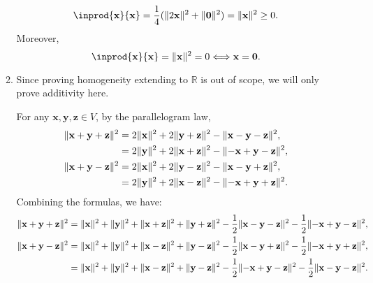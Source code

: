 \documentclass{huhtakm-template-book-v2}
\begin{document}
\begin{proofing}
\begin{itemize}
\begin{enumerate}
\begin{equation*}
                    \inprod{\mathbf{x}}{\mathbf{x}} = \frac{1}{4}(\norm{2\mathbf{x}}^{2} + \norm{\mathbf{0}}^{2}) = \norm{\mathbf{x}}^{2} \geq 0.
                \end{equation*}
                Moreover,
                \begin{equation*}
                    \inprod{\mathbf{x}}{\mathbf{x}} = \norm{\mathbf{x}}^{2} = 0 \Longleftrightarrow \mathbf{x} = \mathbf{0}.
                \end{equation*}
                \item Since proving homogeneity extending to $\mathbb{R}$ is out of scope, we will only prove additivity here. 
                
                For any $\mathbf{x}, \mathbf{y}, \mathbf{z} \in V$, by the parallelogram law,
                \begin{align*}
                    \lVert{\mathbf{x}+\mathbf{y}+\mathbf{z}}\rVert^{2} &= 2\lVert{\mathbf{x}}\rVert^{2} + 2\lVert{\mathbf{y}+\mathbf{z}}\rVert^{2} - \lVert{\mathbf{x}-\mathbf{y}-\mathbf{z}}\rVert^{2},\\
                    &= 2\lVert{\mathbf{y}}\rVert^{2} + 2\lVert{\mathbf{x}+\mathbf{z}}\rVert^{2} - \lVert{-\mathbf{x}+\mathbf{y}-\mathbf{z}}\rVert^{2},\\
                    \lVert{\mathbf{x}+\mathbf{y}-\mathbf{z}}\rVert^{2} &= 2\lVert{\mathbf{x}}\rVert^{2} + 2\lVert{\mathbf{y}-\mathbf{z}}\rVert^{2} - \lVert{\mathbf{x}-\mathbf{y}+\mathbf{z}}\rVert^{2},\\
                    &= 2\lVert{\mathbf{y}}\rVert^{2} + 2\lVert{\mathbf{x}-\mathbf{z}}\rVert^{2} - \lVert{-\mathbf{x}+\mathbf{y}+\mathbf{z}}\rVert^{2}.
                \end{align*}
                Combining the formulas, we have:
                \begin{align*}
                    \norm{\mathbf{x}+\mathbf{y}+\mathbf{z}}^{2} &= \norm{\mathbf{x}}^{2} + \norm{\mathbf{y}}^{2} + \norm{\mathbf{x}+\mathbf{z}}^{2} + \norm{\mathbf{y}+\mathbf{z}}^{2} - \frac{1}{2}\norm{\mathbf{x}-\mathbf{y}-\mathbf{z}}^{2} - \frac{1}{2}\norm{-\mathbf{x}+\mathbf{y}-\mathbf{z}}^{2},\\
                    \norm{\mathbf{x}+\mathbf{y}-\mathbf{z}}^{2} &= \norm{\mathbf{x}}^{2} + \norm{\mathbf{y}}^{2} + \norm{\mathbf{x}-\mathbf{z}}^{2} + \norm{\mathbf{y}-\mathbf{z}}^{2} - \frac{1}{2}\norm{\mathbf{x}-\mathbf{y}+\mathbf{z}}^{2} - \frac{1}{2}\norm{-\mathbf{x}+\mathbf{y}+\mathbf{z}}^{2},\\
                    &= \norm{\mathbf{x}}^{2} + \norm{\mathbf{y}}^{2} + \norm{\mathbf{x}-\mathbf{z}}^{2} + \norm{\mathbf{y}-\mathbf{z}}^{2} - \frac{1}{2}\norm{-\mathbf{x}+\mathbf{y}-\mathbf{z}}^{2} - \frac{1}{2}\norm{\mathbf{x}-\mathbf{y}-\mathbf{z}}^{2}.

\end{align*}
\end{enumerate}
\end{itemize}
\end{proofing}
\end{document}
